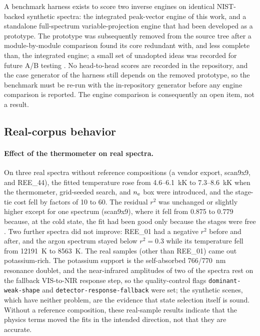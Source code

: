 A benchmark harness exists to score two inverse engines on identical NIST-backed synthetic spectra: the integrated peak-vector engine of this work, and a standalone full-spectrum variable-projection engine that had been developed as a prototype. The prototype was subsequently removed from the source tree after a module-by-module comparison found its core redundant with, and less complete than, the integrated engine; a small set of unadopted ideas was recorded for future A/B testing %
. No head-to-head scores are recorded in the repository, and the case generator of the harness still depends on the removed prototype, so the benchmark must be re-run with the in-repository generator before any engine comparison is reported. %
The engine comparison is consequently an open item, not a result.

\subsection{Real-corpus behavior}

\paragraph{Effect of the thermometer on real spectra.}
On three real spectra without reference compositions (a vendor export, scan9x9, and REE\_44), the fitted temperature rose from 4.6--\SI{6.1}{\kilo\kelvin} to 7.3--\SI{8.6}{\kilo\kelvin} when the thermometer, grid-seeded search, and $n_{\mathrm{e}}$ box were introduced, and the stage-tie cost fell by factors of 10 to 60. The residual $r^2$ was unchanged or slightly higher except for one spectrum (scan9x9), where it fell from 0.875 to 0.779 because, at the cold state, the fit had been good only because the stages were free %
. Two further spectra did not improve: REE\_01 had a negative $r^2$ before and after, and the argon spectrum stayed below $r^2=0.3$ while its temperature fell from \SI{12191}{\kelvin} to \SI{8563}{\kelvin}. The real samples (other than REE\_01) came out potassium-rich. The potassium support is the self-absorbed 766/\SI{770}{\nano\metre} resonance doublet, and the near-infrared amplitudes of two of the spectra rest on the fallback VIS-to-NIR response step, so the quality-control flags \texttt{dominant-weak-shape} and \texttt{detector-response-fallback} were set; the synthetic scenes, which have neither problem, are the evidence that state selection itself is sound. Without a reference composition, these real-sample results indicate that the physics terms moved the fits in the intended direction, not that they are accurate.

